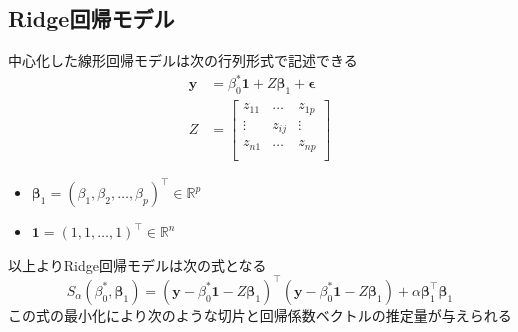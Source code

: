 \documentclass[dvipdfmx, 10pt]{beamer}
\begin{document}
\subsection{Ridge回帰モデル}
\begin{frame}{\insertsubsection}
    中心化した線形回帰モデルは次の行列形式で記述できる
    \begin{equation}
	\begin{split}
		\bm{y} &= \beta_0^* \bm{1} + Z \bm{\beta}_1 + \bm{\epsilon}\\
		Z &= \left[
                \begin{array}{ccc}
                z_{11} & \dots & z_{1p} \\
                \vdots & z_{ij} & \vdots \\
                z_{n1} & \dots & z_{np} \\
                \end{array}
                \right]
        \end{split}
	\label{eq:linear_model_mat}
    \end{equation}
    \begin{itemize}
    	\item $\bm{\beta}_1 = (\beta_1, \beta_2, \dots , \beta_p)^{\top} \in \mathbb{R}^p$
	\item $ \bm{1} = (1, 1, \dots , 1)^{\top} \in \mathbb{R}^n$
    \end{itemize}
    \vspace{10pt}
    以上よりRidge回帰モデルは次の式となる
    \begin{equation}
        	S_{\alpha}(\beta_0^* , \bm{\beta}_1) = (\bm{y} - \beta_0^* \bm{1} - Z \bm{\beta}_1)^{\top} (\bm{y} - \beta_0^* \bm{1} - Z \bm{\beta}_1) + \alpha \bm{\beta}_1^{\top} \bm{\beta}_1 
    	\label{eq:ridge_estimate}
    \end{equation}
    \vspace{10pt}
    この式の最小化により次のような切片と回帰係数ベクトルの推定量が与えられる
\end{frame}
\end{document}
